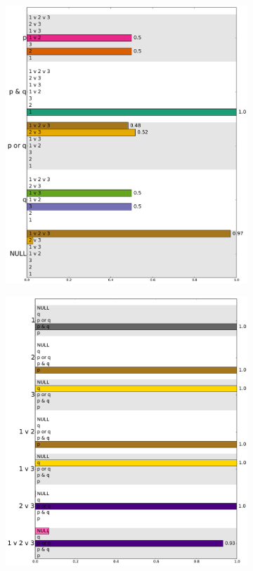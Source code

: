\documentclass{article}
\begin{document}
\begin{figure}[tp]
  \begin{subfigure}{0.48\textwidth}
    \includegraphics[width=1\textwidth]{fig/scalardisj-expertise-listener-marginalized}
  \end{subfigure}
  \hfill
  \begin{subfigure}{0.48\textwidth}
    \includegraphics[width=1\textwidth]{fig/scalardisj-expertise-speaker-lexsum}

\end{subfigure}
\end{figure}
\end{document}
